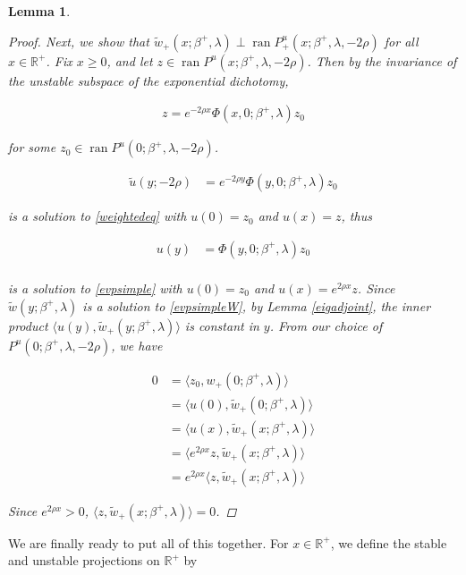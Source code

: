 \documentclass[12pt]{article}
\def\R{{\mathbb R}}
\DeclareMathOperator{\ran}{ran}
\newtheorem{lemma}{Lemma}
\begin{document}
\begin{lemma}
\begin{proof}
Next, we show that $\tilde{w}_+(x; \beta^+, \lambda) \perp \ran P^u_+(x; \beta^+, \lambda, -2 \rho)$ for all $x \in \R^+$. Fix $x \geq 0$, and let $z \in \ran P^u(x; \beta^+, \lambda, -2 \rho)$. Then by the invariance of the unstable subspace of the exponential dichotomy,

\begin{align*}
z = e^{-2 \rho x} \Phi(x, 0; \beta^+, \lambda) z_0
\end{align*}

for some $z_0 \in \ran P^u(0; \beta^+, \lambda, -2 \rho)$.

\begin{align*}
\tilde{u}(y; -2 \rho) &= e^{-2 \rho y} \Phi(y, 0; \beta^+, \lambda)z_0
\end{align*}

is a solution to \eqref{weightedeq} with $u(0) = z_0$ and $u(x) = z$, thus

\begin{align*}
u(y) &= \Phi(y, 0; \beta^+, \lambda) z_0 \\
\end{align*}

is a solution to \eqref{evpsimple} with $u(0) = z_0$ and $u(x) = e^{2 \rho x} z$. Since $\tilde{w}(y; \beta^+, \lambda)$ is a solution to \eqref{evpsimpleW}, by Lemma \ref{eigadjoint}, the inner product $\langle u(y), \tilde{w}_+(y; \beta^+, \lambda) \rangle$ is constant in $y$. From our choice of $P^u(0; \beta^+, \lambda, -2 \rho)$, we have

\begin{align*}
0 &= \langle z_0, w_+(0; \beta^+, \lambda) \rangle \\
&= \langle u(0), \tilde{w}_+(0; \beta^+, \lambda) \rangle \\
&= \langle u(x), \tilde{w}_+(x; \beta^+, \lambda) \rangle \\
&= \langle e^{2 \rho x} z, \tilde{w}_+(x; \beta^+, \lambda) \rangle \\
&= e^{2 \rho x} \langle z, \tilde{w}_+(x; \beta^+, \lambda) \rangle 
\end{align*}

Since $e^{2 \rho x} > 0$, $\langle z, \tilde{w}_+(x; \beta^+, \lambda) \rangle = 0$.

\end{proof}
\end{lemma}

We are finally ready to put all of this together. For $x \in \R^+$, we define the stable and unstable projections on $\R^+$ by
\end{document}
